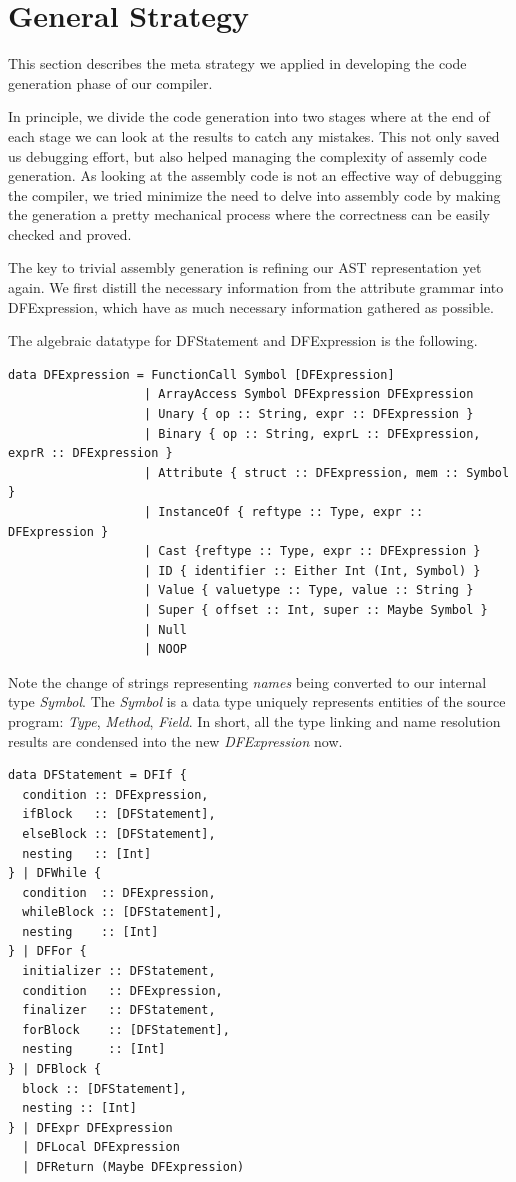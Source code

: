 \documentclass[12pt,letterpaper]{article}
\begin{document}
\section{General Strategy}
This section describes the meta strategy we applied in developing the code generation phase of our compiler.

In principle, we divide the code generation into two stages where at the end of each stage we can look at the results to catch any mistakes. This not only saved us debugging effort, but also helped managing the complexity of assemly code generation. As looking at the assembly code is not an effective way of debugging the compiler, we tried minimize the need to delve into assembly code by making the generation a pretty mechanical process where the correctness can be easily checked and proved.

The key to trivial assembly generation is refining our AST representation yet again. We first distill the necessary information from the attribute grammar into DFExpression, which have as much necessary information gathered as possible.

The algebraic datatype for DFStatement and DFExpression is the following.
\begin{lstlisting}
data DFExpression = FunctionCall Symbol [DFExpression]
                   | ArrayAccess Symbol DFExpression DFExpression
                   | Unary { op :: String, expr :: DFExpression }
                   | Binary { op :: String, exprL :: DFExpression, exprR :: DFExpression }
                   | Attribute { struct :: DFExpression, mem :: Symbol }
                   | InstanceOf { reftype :: Type, expr :: DFExpression }
                   | Cast {reftype :: Type, expr :: DFExpression }
                   | ID { identifier :: Either Int (Int, Symbol) }
                   | Value { valuetype :: Type, value :: String }
                   | Super { offset :: Int, super :: Maybe Symbol }
                   | Null
                   | NOOP
\end{lstlisting}

Note the change of strings representing \emph{names} being converted to our internal type \emph{Symbol}. The \emph{Symbol} is a data type uniquely represents entities of the source program: \emph{Type}, \emph{Method}, \emph{Field}. In short, all the type linking and name resolution results are condensed into the new \emph{DFExpression} now.

\begin{lstlisting}
data DFStatement = DFIf {
  condition :: DFExpression,
  ifBlock   :: [DFStatement],
  elseBlock :: [DFStatement],
  nesting   :: [Int]
} | DFWhile {
  condition  :: DFExpression,
  whileBlock :: [DFStatement],
  nesting    :: [Int]
} | DFFor {
  initializer :: DFStatement,
  condition   :: DFExpression,
  finalizer   :: DFStatement,
  forBlock    :: [DFStatement],
  nesting     :: [Int]
} | DFBlock {
  block :: [DFStatement],
  nesting :: [Int]
} | DFExpr DFExpression
  | DFLocal DFExpression
  | DFReturn (Maybe DFExpression)
\end{lstlisting}
\end{document}
